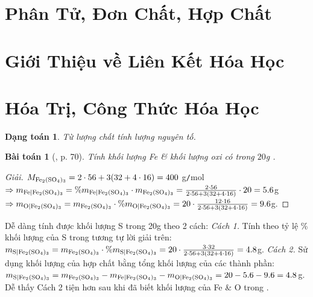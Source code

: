 \documentclass{article}
\newtheorem{baitoan}{Bài toán}
\newtheorem{dangtoan}{Dạng toán}
\begin{document}

\section{Phân Tử, Đơn Chất, Hợp Chất}


\section{Giới Thiệu về Liên Kết Hóa Học}


\section{Hóa Trị, Công Thức Hóa Học}

\begin{dangtoan}
	Từ lượng chất tính lượng nguyên tố.
\end{dangtoan}

\begin{baitoan}[\cite{Tuan2022}, p. 70]
	Tính khối lượng \emph{Fe} \& khối lượng oxi có trong $20$\emph{g} \emph{}.
\end{baitoan}

\begin{proof}[Giải]
	$M_{\ce{Fe2(SO4)3}} = 2\cdot56 + 3(32 + 4\cdot16) = 400$ g\texttt{/}mol$\Rightarrow m_{\ce{Fe|Fe2(SO4)3}} = \%m_{\ce{Fe|Fe2(SO4)3}}\cdot m_{\ce{Fe2(SO4)3}} = \frac{2\cdot56}{2\cdot56 + 3(32 + 4\cdot16)}\cdot20 = 5.6$g$\Rightarrow m_{\ce{O|Fe2(SO4)3}} = m_{\ce{Fe2(SO4)3}}\cdot\%m_{\ce{O|Fe2(SO4)3}} = 20\cdot\frac{12\cdot16}{2\cdot56 + 3(32 + 4\cdot16)} = 9.6$g.
\end{proof}
Dễ dàng tính được khối lượng S trong 20g  theo 2 cách: \textit{Cách 1.} Tính theo tỷ lệ \% khối lượng của S trong  tương tự lời giải trên: $m_{\ce{S|Fe2(SO4)3}} = m_{\ce{Fe2(SO4)3}}\cdot\%m_{\ce{S|Fe2(SO4)3}} = 20\cdot\frac{3\cdot32}{2\cdot56 + 3(32 + 4\cdot16)} = 4.8$g. \textit{Cách 2.} Sử dụng khối lượng của hợp chất bằng tổng khối lượng của các thành phần: $m_{\ce{S|Fe2(SO4)3}} = m_{\ce{Fe2(SO4)3}} - m_{\ce{Fe|Fe2(SO4)3}} - m_{\ce{O|Fe2(SO4)3}} = 20 - 5.6 - 9.6 = 4.8$g. Dễ thấy Cách 2 tiện hơn sau khi đã biết khối lượng của Fe \& O trong .
\end{document}
